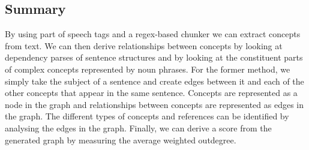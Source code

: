\documentclass[12pt]{article}
\theoremstyle{grammarstyle}
\begin{document}
\subsection{Summary}
By using part of speech tags and a regex-based chunker we can extract concepts from text. We can then derive relationships between concepts by looking at dependency parses of sentence structures and by looking at the constituent parts of complex concepts represented by noun phrases. For the former method, we simply take the subject of a sentence and create edges between it and each of the other concepts that appear in the same sentence. Concepts are represented as a node in the graph and relationships between concepts are represented as edges in the graph.
The different types of concepts and references can be identified by analysing the edges in the graph. Finally, we can derive a score from the generated graph by measuring the average weighted outdegree.

\end{document}

